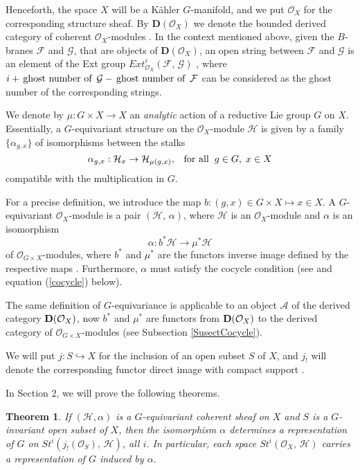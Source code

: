 \documentclass[xypic,amscd,syntonly,amssymb,verbatim,12pt]{amsart}
\theoremstyle{plain}
\newtheorem{Thm}{Theorem}
\theoremstyle{definition}
\theoremstyle{remark}
\numberwithin{equation}{section}
\begin{document}
Henceforth, the  space $X$ will be  a K\"ahler $G$-manifold, and
we put ${\mathcal O}_X$ for the corresponding structure sheaf. By
${\mathbf D}({\mathcal O}_X)$ we denote the bounded derived
category of coherent ${\mathcal O}_X$-modules
\cite{Kas-Sch}. In the context mentioned above, given
 the $B$-branes  ${\mathcal F}$ and ${\mathcal G}$,
that are objects of ${\mathbf D}({\mathcal O}_X)$, an open string
between  ${\mathcal F}$ and ${\mathcal G}$  is an element of the
Ext group ${Ext}^i_{{\mathcal O}_X}({\mathcal F},\,{\mathcal G})$
\cite{Aspin, Wei}, where $i+\,\hbox{ghost number of }\,{\mathcal
G}-\,\hbox{ghost number of }\,{\mathcal F}$ can be considered as
the ghost number of the corresponding strings.

 We denote by $\mu:G\times X\to X$ an {\em analytic} action of a reductive Lie group $G$ on $X$. Essentially,
 a $G$-equivariant structure on the ${\mathcal O}_X$-module  ${\mathcal H}$ is given by a family
 $\{\alpha_{g,x}\}$ of isomorphisms between the stalks
 $$\alpha_{g,x}:{\mathcal H}_x  \to{\mathcal H}_{\mu(g,x)},\;\;\;\hbox{for all}\;\;g\in G,\;x\in X$$
 compatible with the multiplication in $G$.

For a precise definition, we introduce the map $b:(g,x)\in G\times
X\mapsto x\in X$. A $G$-equivariant ${\mathcal O}_X$-module is a
pair $({\mathcal H},\,\alpha)$, where
 ${\mathcal H}$ is an ${\mathcal O}_X$-module  and $\alpha$ is  an isomorphism
\begin{equation}\label{b*mathcal}
\alpha:b^*{\mathcal H}\to \mu^*{\mathcal H}
 \end{equation}
 of ${\mathcal
O}_{G\times X}$-modules, where $b^*$ and $\mu^*$ are the functors
inverse image defined by the respective maps \cite[page
136]{Ge-Ma}. Furthermore, $\alpha$ must satisfy the cocycle condition
(see \cite[page 2]{Be-Lu} and equation (\ref{cocycle}) below).


The same definition of $G$-equivariance is applicable to an object
${\mathcal A}$ of the derived category ${\bf D}({\mathcal O}_X)$,
now  $b^*$ and $\mu^*$ are functors from  ${\bf D}({\mathcal
O}_X)$ to the derived category of ${\mathcal O}_{G\times
X}$-modules (see Subsection \ref{SusectCocycle}).

We will put $j:S\hookrightarrow X$ for the inclusion of an open
subset $S$ of $X$, and $j_!$  will denote the corresponding
functor direct image with compact support \cite[page
103]{Kas-Sch}.

In Section 2, we will prove the following theorems.
\begin{Thm}\label{Thmrepresentasheaf}
 If $({\mathcal H},\alpha)$ is a $G$-equivariant coherent sheaf on $X$ and $S$ is a $G$-invariant open subset of $X$,
 then the isomorphism $\alpha$ determines a representation of $G$ on $St^i(j_!({\mathcal O}_S),\,{\mathcal H})$, all $i$.
 In particular, each space $St^i({\mathcal O}_X,\,{\mathcal H})$
 carries a representation of $G$ induced by $\alpha$.
 \end{Thm}
\end{document}
